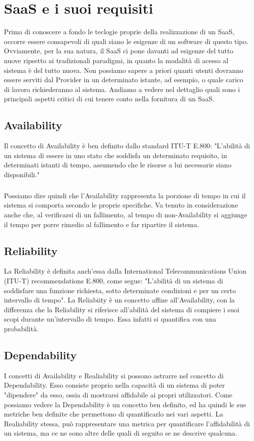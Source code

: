 \chapter{SaaS e i suoi requisiti}
Prima di conoscere a fondo le teclogie proprie della realizzazione di un SaaS, occorre essere consapevoli di quali siano le esigenze di un software di questo tipo. Ovviamente, per la sua natura, il SaaS ci pone davanti ad esigenze del tutto nuove ripsetto ai tradizionali paradigmi, in quanto la modalità di acesso al sistema è del tutto nuova. Non possiamo sapere a priori quanti utenti dovranno essere serviti dal Provider in un determinato istante, ad esempio, o quale carico di lavoro richiederanno al sistema. Andiamo a vedere nel dettaglio quali sono i principali aspetti critici di cui tenere conto nella fornitura di un SaaS.

\section{Availability}
Il concetto di Availability è ben definito dallo standard ITU-T E.800: "L'abilità di un sistema di essere in uno stato che soddisfa un determinato requisito, in determinati istanti di tempo, assumendo che le risorse a lui necessarie siano disponibili." 

\paragraph{}
Possiamo dire quindi che l'Availability rappresenta la porzione di tempo in cui il sistema si comporta secondo le proprie specifiche. Va tenuto in considerazione anche che, al verificarsi di un fallimento, al tempo di non-Availability si aggiunge il tempo per porre rimedio al fallimento e far ripartire il sistema. 

\section{Reliability}
La Reliability è definita anch'essa dalla International Telecommunications Union (ITU-T) recommendations E.800, come segue: "L'abilità di un sistema di soddisfare una funzione richiesta, sotto determinate condizioni e per un certo intervallo di tempo". La Reliabiity è un concetto affine all'Availability, con la differenza che la Reliability si riferisce all'abilità del sistema di compiere i suoi scopi durante un'intervallo di tempo. Essa infatti si quantifica con una probabilità.

\section{Dependability}
I concetti di Availability e Realiability si possono astrarre nel concetto di Dependability. Esso consiste proprio nella capacità di un sistema di poter "dipendere" da esso, ossia di mostrarsi affidabile ai propri utilizzatori. Come possiamo vedere la Dependability è un concetto ben definito, ed ha quindi le sue metriche ben definite che permettono di quantificarlo nei vari aspetti. La Realiability stessa, può rappresentare una metrica per quantificare l'affidabilità di un sistema, ma ce ne sono altre delle quali di seguito se ne descrive qualcuna.


